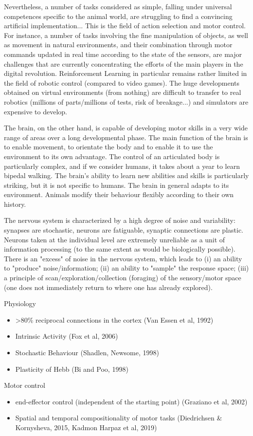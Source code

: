 \documentclass[runningheads]{llncs}
\begin{document}
Nevertheless, a number of tasks considered as simple, falling under universal competences specific to the animal world, are struggling to find a convincing artificial implementation... This is the field of action selection and motor control. For instance, a number of tasks involving the fine manipulation of objects, as well as movement in natural environments, and their combination through motor commands updated in real time according to the state of the sensors, are major challenges that are currently concentrating the efforts of the main players in the digital revolution.
Reinforcement Learning in particular remains rather limited in the field of robotic control (compared to video games). The huge developments obtained on virtual environments (from nothing) are difficult to transfer to real robotics (millions of parts/millions of tests, risk of breakage...) and simulators are expensive to develop.

The brain, on the other hand, is capable of developing motor skills in a very wide range of areas over a long developmental phase.   
The main function of the brain is to enable movement, to orientate the body and to enable it to use the environment to its own advantage. The control of an articulated body is particularly complex, and if we consider humans, it takes about a year to learn bipedal walking. The brain's ability to learn new abilities and skills is particularly striking, but it is not specific to humans. The brain in general adapts to its environment. Animals modify their behaviour flexibly according to their own history. 

The nervous system is characterized by a high degree of noise and variability: synapses are stochastic, neurons are fatiguable, synaptic connections are plastic. Neurons taken at the individual level are extremely unreliable as a unit of information processing (to the same extent as would be biologically possible). There is an "excess" of noise in the nervous system, which leads to (i) an ability to "produce" noise/information; (ii) an ability to "sample" the response space; (iii) a principle of scan/exploration/collection (foraging) of the sensory/motor space (one does not immediately return to where one has already explored).

Physiology
\begin{itemize}
	\item >80\% reciprocal connections in the cortex (Van Essen et al, 1992)
	\item Intrinsic Activity (Fox et al, 2006)
	\item Stochastic Behaviour (Shadlen, Newsome, 1998)
	\item Plasticity of Hebb (Bi and Poo, 1998)	
\end{itemize}
Motor control
\begin{itemize}
	\item end-effector control  (independent of the starting point) (Graziano et al, 2002)
	\item Spatial and temporal compositionality of motor tasks (Diedrichsen \& Kornysheva, 2015, Kadmon Harpaz et al, 2019)
\end{itemize}
\end{document}
